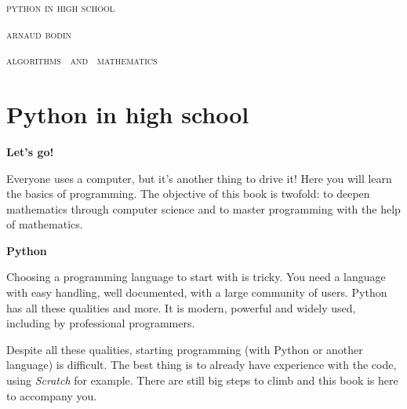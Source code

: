 
\pagestyle{empty}\thispagestyle{empty}
\vspace*{\fill}
\vspace*{5ex}
\begin{center}
\fontsize{30}{30}\selectfont
\textsc{python in high school}


\vspace*{2ex}

\Large
\textsc{arnaud bodin}

\end{center}
\vfill
\begin{center}
\Large
\textsc{algorithms \  and  \  mathematics}
\end{center}
\begin{center}
\end{center}

\clearpage

\thispagestyle{empty}

\vspace*{\fill}
\section*{Python in high school}

{\large\textbf{Let's go!}}

Everyone uses a computer, but it's another thing to drive it! Here you will learn the basics of programming. The objective of this book is twofold: to deepen mathematics through computer science and to master programming with the help of mathematics. 

\bigskip

{\large\textbf{Python}}

Choosing a programming language to start with is tricky. You need a language with easy handling, well documented, with a large community of users. Python has all these qualities and more. It is modern, powerful and widely used, including by professional programmers. 

Despite all these qualities, starting programming (with Python or another language) is difficult. The best thing is to already have experience with the code, using \emph{Scratch} for example. There are still big steps to climb and this book is here to accompany you.

